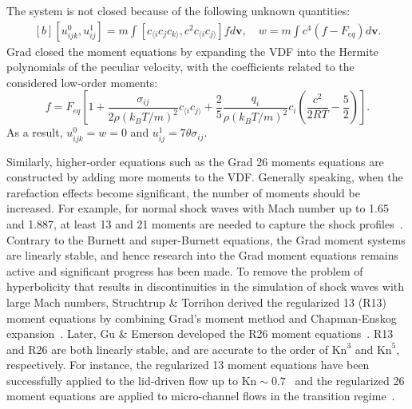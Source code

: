 The system is not closed because of the following unknown quantities:
\begin{equation}
\begin{aligned}[b]
[u^0_{ijk},u^1_{ij}]=m\int [c_{\langle i}c_jc_{k\rangle},c^2c_{\langle i}c_{j\rangle}] fd\bm{v}, \quad
w=m\int c^4  (f-F_{eq}) d\bm{v}.
\end{aligned}
\end{equation} 
Grad closed the moment equations by expanding the VDF into the Hermite polynomials of the peculiar velocity, with the coefficients related to the considered low-order moments:
\begin{equation}\label{Grad13VDF}
f=F_{eq}\left[1+\frac{\sigma_{ij}  }{2\rho(k_BT/m)^2}c_{\langle i}c_{j\rangle}
+\frac{2}{5}\frac{q_i}{\rho(k_BT/m)^2}c_i\left(\frac{c^2}{2RT}-\frac{5}{2}\right)\right].
\end{equation}
As a result, $u^0_{ijk}=w=0$ and $u^1_{ij}=7\theta\sigma_{ij}$.






Similarly, higher-order equations such as the Grad 26 moments equations are constructed by adding more moments to the VDF. Generally speaking, when the rarefaction effects become significant, the number of moments should be increased. For example, for normal shock waves with Mach number up to 1.65 and 1.887, at least 13 and 21 moments are needed to capture the shock profiles~\cite{Weiss1995}. Contrary to the Burnett and super-Burnett equations, the Grad moment systems are linearly stable, and hence research into the Grad moment equations remains active and significant progress has been made. To remove the problem of hyperbolicity that results in discontinuities in the simulation of shock waves with large Mach numbers, Struchtrup \& Torrihon derived the regularized 13 (R13) moment equations by combining Grad's moment method and Chapman-Enskog expansion~\cite{StruchtrupTorrihon2003}. Later, Gu \& Emerson developed the R26 moment equations~\cite{Gu2009JFM}. R13 and R26 are both linearly stable, and are accurate to the order of $\text{Kn}^3$ and $\text{Kn}^5$, respectively.  For instance, the regularized 13 moment equations have been successfully applied to the lid-driven flow up to $\text{Kn}\sim0.7$~\cite{Rana2013} and the regularized 26 moment equations are applied to micro-channel flows in the transition regime~\cite{Gu2009JFM}.




